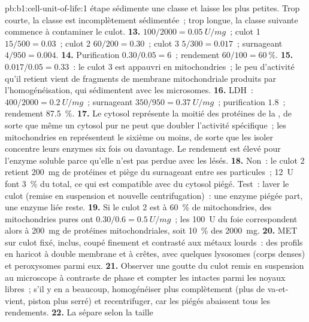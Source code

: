 \begin{solution}{pb:b1:cell-unit-of-life:1}
étape sédimente une classe et laisse les plus petites. Trop courte, la
classe est incomplètement sédimentée~; trop longue, la classe suivante
commence à contaminer le culot.
\textbf{13.}  $100/2000 = \qty{0.05}{U/mg}$~; culot 1
$15/500 = 0.03$~; culot 2 $60/200 = 0.30$~; culot 3 $5/300 = 0.017$~;
surnageant $4/950 = 0.004$.
\textbf{14.} Purification $0.30/0.05 = 6$~; rendement $60/100 =
\qty{60}{\%}$.
\textbf{15.} $0.017/0.05 = 0.33$~: le culot 3 est appauvri en mitochondries~; le peu d'activité qu'il retient vient de fragments de membrane mitochondriale produits par l'homogénéisation, qui sédimentent avec les microsomes.
\textbf{16.} LDH~:  $400/2000 = \qty{0.2}{U/mg}$~; surnageant
$350/950 = \qty{0.37}{U/mg}$~; purification $1.8$~; rendement \qty{87.5}{\%}.
\textbf{17.} Le cytosol représente la moitié des protéines de la
, de sorte que même un cytosol pur ne peut que doubler l'activité
spécifique~; les mitochondries en représentent le sixième ou moins, de
sorte que les isoler concentre leurs enzymes six fois ou davantage. Le
rendement est élevé pour l'enzyme soluble parce qu'elle n'est pas perdue
avec les  lésés.
\textbf{18.} Non~: le culot 2 retient \qty{200}{mg} de protéines et
piège du surnageant entre ses particules~; \qty{12}{U} font \qty{3}{\%}
du total, ce qui est compatible avec du cytosol piégé. Test~: laver le
culot (remise en suspension et nouvelle centrifugation)~: une enzyme
piégée part, une enzyme liée reste.
\textbf{19.} Si le culot 2 est à \qty{60}{\%} de mitochondries, des
mitochondries pures ont $0.30/0.6 = \qty{0.5}{U/mg}$~; les \qty{100}{U}
du foie correspondent alors à \qty{200}{mg} de protéines
mitochondriales, soit \qty{10}{\%} des \qty{2000}{mg}.
\textbf{20.} MET sur culot fixé, inclus, coupé finement et contrasté aux
métaux lourds~: des profils en haricot à double membrane et à crêtes,
avec quelques lysosomes (corps denses) et peroxysomes parmi eux.
\textbf{21.} Observer une goutte du culot remis en suspension au microscope à contraste de phase et compter les  intactes parmi les noyaux libres~; s'il y en a beaucoup, homogénéiser plus complètement (plus de va-et-vient, piston plus serré) et recentrifuger, car les  piégés abaissent tous les rendements.
\textbf{22.} La  sépare selon la taille

\end{solution}
